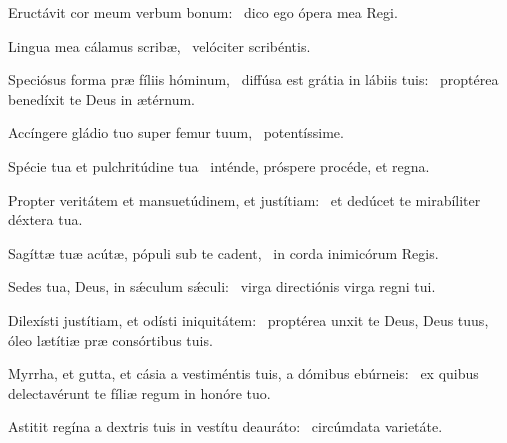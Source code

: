\item Eructávit cor meum verbum bonum:~\psstar{} dico ego ópera mea Regi.

\item Lingua mea cálamus scribæ,~\psstar{} velóciter scribéntis.

\item Speciósus forma præ fíliis hóminum,~\pscross{} diffúsa est grátia in lábiis tuis:~\psstar{} proptérea benedíxit te Deus in ætérnum.

\item Accíngere gládio tuo super femur tuum,~\psstar{} potentíssime.

\item Spécie tua et pulchritúdine tua~\psstar{} inténde, próspere procéde, et regna.

\item Propter veritátem et mansuetúdinem, et justítiam:~\psstar{} et dedúcet te mirabíliter déxtera tua.

\item Sagíttæ tuæ acútæ, pópuli sub te cadent,~\psstar{} in corda inimicórum Regis.

\item Sedes tua, Deus, in sǽculum sǽculi:~\psstar{} virga directiónis virga regni tui.

\item Dilexísti justítiam, et odísti iniquitátem:~\psstar{} proptérea unxit te Deus, Deus tuus, óleo lætítiæ præ consórtibus tuis.

\item Myrrha, et gutta, et cásia a vestiméntis tuis, a dómibus ebúrneis:~\psstar{} ex quibus delectavérunt te fíliæ regum in honóre tuo.

\item Astitit regína a dextris tuis in vestítu deauráto:~\psstar{} circúmdata varietáte.


